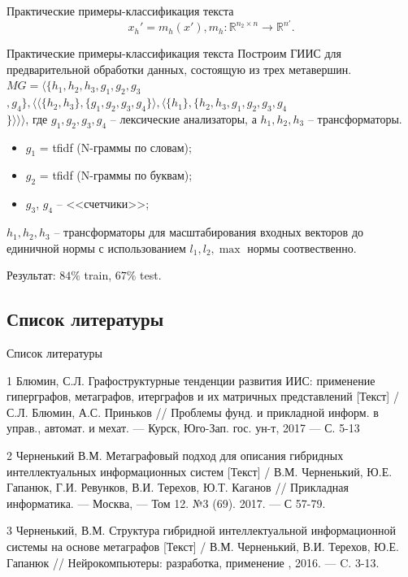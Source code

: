\documentclass{beamer}
\begin{document}
\begin{darkframes}
\begin{frame}{Практические примеры-классификация текста}
$$x_{h}' = m_h(x'), m_h : \mathbb{R}^{n_2 \times n} \to \mathbb{R}^{n'}.$$
		\end{frame}

		\begin{frame}{Практические примеры-классификация текста}
			Построим ГИИС для предварительной обработки данных, состоящую из трех метавершин. $MG = \Big\langle \{h_1, h_2, h_3, g_1, g_2, g_3$\\$, g_4\}, \big \langle \langle \{h_2, h_3\}, \{g_1, g_2, g_3,g_4\} \rangle, \langle \{h_1\},\{h_2, h_3, g_1, g_2, g_3, g_4$\\$\} \rangle \big \rangle\Big\rangle$, где $g_1,g_2, g_3, g_4$ -- лексические анализаторы, а $h_1, h_2, h_3$ -- трансформаторы.
			\begin{itemize}
				\item $g_1$ = tfidf (N-граммы по словам);
				\item $g_2$ = tfidf (N-граммы по буквам);
				\item $g_3$, $g_4$ -- <<счетчики>>;
			\end{itemize}	

			$h_1,h_2,h_3$ -- трансформаторы для масштабирования входных векторов до единичной нормы с использованием $l_1,l_2, \max$ нормы соотвественно.

			Результат: $84\%$ train, $67\%$ test.
		\end{frame}


	
		\subsection{Список литературы}
		\begin{frame}[label=bibliography]{Список литературы}
			\begin{thebibliography}{9}
					\justifying
				\small{
					\item[1] Блюмин, С.Л. Графоструктурные тенденции развития ИИС: применение гиперграфов, метаграфов, итерграфов и их матричных представлений [Текст] / С.Л. Блюмин, А.С. Приньков // Проблемы фунд. и прикладной информ. в управ., автомат. и мехат. --- Курск, Юго-Зап. гос. ун-т, 2017 --- С. 5-13
					\item[2] Черненький В.М. Метаграфовый подход для описания гибридных интеллектуальных информационных систем [Текст] / В.М. Черненький, Ю.Е. Гапанюк, Г.И. Ревунков, В.И. Терехов, Ю.Т. Каганов // Прикладная информатика. --- Москва, --- Том 12. №3 (69). 2017. --- С 57-79.	
					\item[3] Черненький, В.М. Структура гибридной интеллектуальной информационной системы на основе метаграфов [Текст] / В.М. Черненький, В.И. Терехов, Ю.Е. Гапанюк // Нейрокомпьютеры: разработка, применение , 2016. --- C. 3-13.
					
}
\end{thebibliography}
\end{frame}
\end{darkframes}
\end{document}
